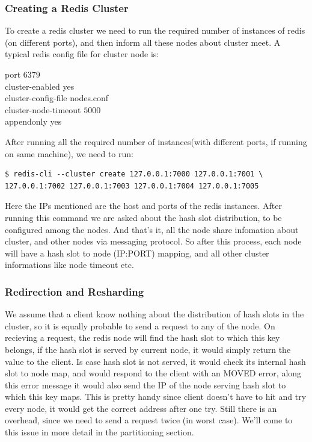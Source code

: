 \documentclass[11pt]{article}
\begin{document}
\subsubsection*{Creating a Redis Cluster}
To create a redis cluster we need to run the required number of instances of redis
(on different ports), and then inform all these nodes about cluster meet. A typical
redis config file for cluster node is:
\begin{file}
port $6379$ \\
cluster-enabled yes \\
cluster-config-file nodes.conf \\
cluster-node-timeout $5000$ \\
appendonly yes \\
\end{file}

After running all the required number of instances(with different ports, if
running on same machine), we need to run:
\begin{lstlisting}
$ redis-cli --cluster create 127.0.0.1:7000 127.0.0.1:7001 \
127.0.0.1:7002 127.0.0.1:7003 127.0.0.1:7004 127.0.0.1:7005 
\end{lstlisting}
Here the IPs mentioned are the host and ports of the redis instances. After 
running this command we are asked about the hash slot distribution, to be configured
among the nodes. And that's it, all the node share infomation about cluster,
and other nodes via messaging protocol. So after this process, each node will have a
hash slot to node (IP:PORT) mapping, and all other cluster informations like node timeout etc.

\subsubsection*{Redirection and Resharding}
We assume that a client know nothing about the distribution of hash slots in the cluster,
so it is equally probable to send a request to any of the node.
On recieving a request, the redis node will find the hash slot to which this key
belongs, if the hash slot is served by current node, it would simply return the value
to the client. Is case hash slot is not served, it would check its internal hash slot
to node map, and would respond to the client with an MOVED error, along this error
message it would also send the IP of the node serving hash slot to which this key maps.
This is pretty handy since client doesn't have to hit and try every node,
it would get the correct address after one try. Still there is an overhead, since we
need to send a request twice (in worst case). We'll come to this issue in more detail
in the partitioning section.
\\
\end{document}
